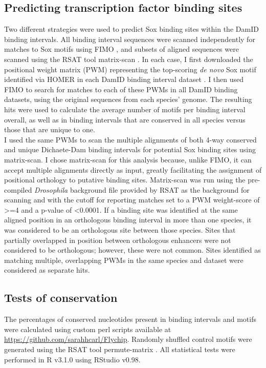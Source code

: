 \subsection{Predicting transcription factor binding sites}
Two different strategies were used to predict Sox binding sites within the DamID binding intervals. All binding interval sequences were scanned independently for matches to Sox motifs using FIMO \citep{grant_fimo:_2011}, and subsets of aligned sequences were scanned using the RSAT tool matrix-scan \citep{sand_analyzing_2008,turatsinze_using_2008}. In each case, I first downloaded the positional weight matrix (PWM) representing the top-scoring \emph{de novo} Sox motif identified via HOMER in each DamID binding interval dataset \citep{heinz_simple_2010}. I then used FIMO to search for matches to each of these PWMs in all DamID binding datasets, using the original sequences from each species’ genome. The resulting hits were used to calculate the average number of motifs per binding interval overall, as well as in binding intervals that are conserved in all species versus those that are unique to one.\\

I used the same PWMs to scan the multiple alignments of both 4-way conserved and unique Dichaete-Dam binding intervals for potential Sox binding sites using matrix-scan. I chose matrix-scan for this analysis because, unlike FIMO, it can accept multiple alignments directly as input, greatly facilitating the assignment of positional orthology to putative binding sites. Matrix-scan was run using the pre-compiled \emph{Drosophila} background file provided by RSAT as the background for scanning and with the cutoff for reporting matches set to a PWM weight-score of \textgreater=4 and a p-value of \textless 0.0001. If a binding site was identified at the same aligned position in an orthologous binding interval in more than one species, it was considered to be an orthologous site between those species. Sites that partially overlapped in position between orthologous enhancers were not considered to be orthologous; however, these were not common. Sites identified as matching multiple, overlapping PWMs in the same species and dataset were considered as separate hits. 

\subsection{Tests of conservation}
The percentages of conserved nucleotides present in binding intervals and motifs were calculated using custom perl scripts available at \url{https://github.com/sarahhcarl/Flychip}. Randomly shuffled control motifs were generated using the RSAT tool permute-matrix \citep{thomas-chollier_rsat_2011}. All statistical tests were performed in R v3.1.0 using RStudio v0.98.
